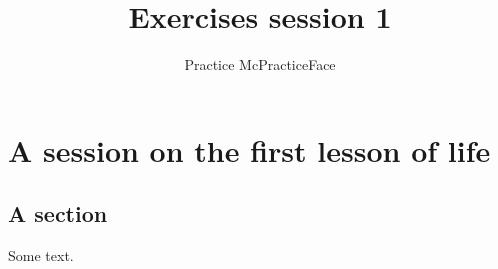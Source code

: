 \documentclass[12pt]{bwpracticum}
\title{Exercises session 1}
\author{Practice McPracticeFace}
\begin{document}
\chapter{A session on the first lesson of life}

\hypertarget{a-section}{%
\section{A section}\label{a-section}}

Some text.
\end{document}
